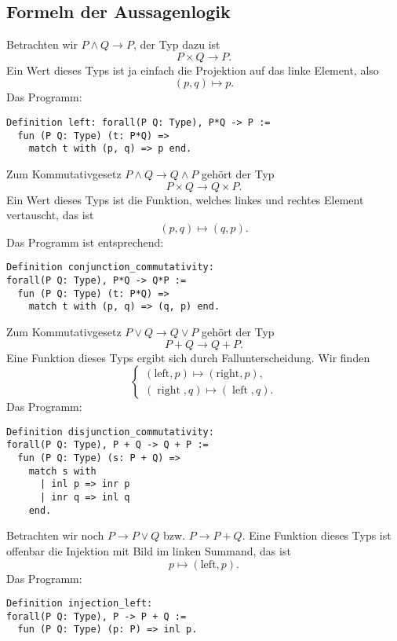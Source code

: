 \documentclass[a4paper,10pt,fleqn,twocolumn,twoside,dvipdfmx]{scrartcl}
\numberwithin{equation}{section}
\begin{document}
\subsection{Formeln der Aussagenlogik}

Betrachten wir $P\land Q\to P$, der Typ dazu ist
\[P\times Q\to P.\]
Ein Wert dieses Typs ist ja einfach die Projektion auf das linke
Element, also
\[(p, q)\mapsto p.\]
Das Programm:
\begin{lstlisting}[language=Coq]
Definition left: forall(P Q: Type), P*Q -> P :=
  fun (P Q: Type) (t: P*Q) =>
    match t with (p, q) => p end.
\end{lstlisting}
Zum Kommutativgesetz $P\land Q\to Q\land P$ gehört der Typ
\begin{equation}
P\times Q\to Q\times P.
\end{equation}
Ein Wert dieses Typs ist die Funktion, welches linkes und rechtes
Element vertauscht, das ist
\[(p, q)\mapsto (q, p).\]
Das Programm ist entsprechend:
\begin{lstlisting}[language=Coq]
Definition conjunction_commutativity:
forall(P Q: Type), P*Q -> Q*P :=
  fun (P Q: Type) (t: P*Q) =>
    match t with (p, q) => (q, p) end.
\end{lstlisting}
Zum Kommutativgesetz $P\lor Q\to Q\lor P$ gehört der Typ
\begin{equation}
P+Q\to Q+P.
\end{equation}
Eine Funktion dieses Typs ergibt sich durch Fallunterscheidung.
Wir finden
\begin{equation}
\begin{cases}
  (\mathrm{left},p)  \mapsto (\mathrm{right},p),\\
  (\operatorname{right},q) \mapsto (\operatorname{left},q).\end{cases}
\end{equation}
Das Programm:
\begin{lstlisting}[language=Coq]
Definition disjunction_commutativity:
forall(P Q: Type), P + Q -> Q + P :=
  fun (P Q: Type) (s: P + Q) =>
    match s with
      | inl p => inr p
      | inr q => inl q 
    end.
\end{lstlisting}
Betrachten wir noch $P\to P\lor Q$ bzw. $P\to P+Q$. Eine Funktion
dieses Typs ist offenbar die Injektion mit Bild im linken Summand,
das ist
\begin{equation}
p\mapsto (\mathrm{left},p).
\end{equation}
Das Programm:
\begin{lstlisting}[language=Coq]
Definition injection_left:
forall(P Q: Type), P -> P + Q :=
  fun (P Q: Type) (p: P) => inl p.
\end{lstlisting}
\end{document}
